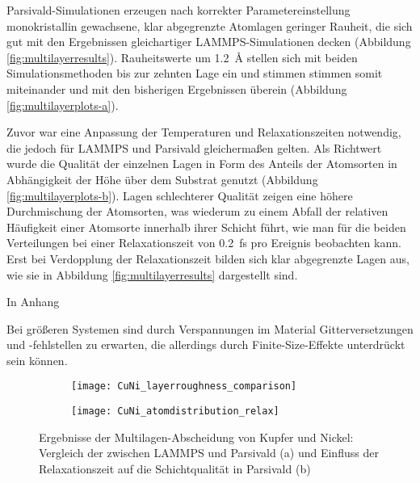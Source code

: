 Parsivald-Simulationen erzeugen nach korrekter Parametereinstellung monokristallin gewachsene, klar abgegrenzte Atomlagen geringer Rauheit, die sich gut mit den Ergebnissen gleichartiger LAMMPS-Simulationen decken (Abbildung \ref{fig:multilayerresults}).
Rauheitswerte um \SI{1.2}{\angstrom} stellen sich mit beiden Simulationsmethoden bis zur zehnten Lage ein und stimmen stimmen somit miteinander und mit den bisherigen Ergebnissen überein (Abbildung \ref{fig:multilayerplots-a}).

Zuvor war eine Anpassung der Temperaturen und Relaxationszeiten notwendig, die jedoch für LAMMPS und Parsivald gleichermaßen gelten.
Als Richtwert wurde die Qualität der einzelnen Lagen in Form des Anteils der Atomsorten in Abhängigkeit der Höhe über dem Substrat genutzt (Abbildung \ref{fig:multilayerplots-b}).
Lagen schlechterer Qualität zeigen eine höhere Durchmischung der Atomsorten, was wiederum zu einem Abfall der relativen Häufigkeit einer Atomsorte innerhalb ihrer Schicht führt, wie man für die beiden Verteilungen bei einer Relaxationszeit von \SI{0.2}{\femto\second} pro Ereignis beobachten kann.
Erst bei Verdopplung der Relaxationszeit bilden sich klar abgegrenzte Lagen aus, wie sie in Abbildung \ref{fig:multilayerresults} dargestellt sind.

In Anhang 


Bei größeren Systemen sind durch Verspannungen im Material Gitterversetzungen und -fehlstellen zu erwarten, die allerdings durch Finite-Size-Effekte unterdrückt sein können.

\begin{figure}
  \captionsetup[subfigure]{singlelinecheck=false}
  \def\subfigwidth{7cm}
  \begin{subfigure}[t]{\subfigwidth}
    \texttt{[image: CuNi\_layerroughness\_comparison]}
  \end{subfigure}
  \hfill
  \begin{subfigure}[t]{\subfigwidth}
    \texttt{[image: CuNi\_atomdistribution\_relax]}
  \end{subfigure}
  \caption[Ergebnisse der Multilagen-Abscheidung von Kupfer und Nickel]{
    Ergebnisse der Multilagen-Abscheidung von Kupfer und Nickel:
    Vergleich der zwischen LAMMPS und Parsivald (a) und Einfluss der Relaxationszeit auf die Schichtqualität in Parsivald (b)
  }
  \label{fig:multilayerplots}
\end{figure}

